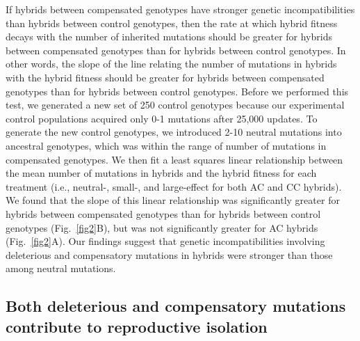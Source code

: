 \documentclass{article}
\begin{document}
If hybrids between compensated genotypes
have stronger genetic incompatibilities
than hybrids between control genotypes,
then the rate at which hybrid fitness decays
with the number of inherited mutations should be greater
for hybrids between compensated genotypes
than for hybrids between control genotypes.
%
In other words, the slope of the line relating
the number of mutations in hybrids
with the hybrid fitness should be greater
for hybrids between compensated genotypes
than for hybrids between control genotypes.
%
Before we performed this test,
we generated a new set of 250 control genotypes
because our experimental control populations
acquired only 0-1 mutations after 25,000 updates.
%
To generate the new control genotypes,
we introduced 2-10 neutral mutations into ancestral genotypes,
which was within the range of number of mutations in compensated genotypes.
%
We then fit a least squares linear relationship between
the mean number of mutations in hybrids
and the hybrid fitness for each treatment
(i.e., neutral-, small-, and large-effect for both AC and CC hybrids).
%
We found that the slope of this linear relationship
was significantly greater for hybrids between compensated genotypes
than for hybrids between control genotypes (Fig.~\ref{fig2}B),
but was not significantly greater for AC hybrids (Fig.~\ref{fig2}A).
%
Our findings suggest that genetic incompatibilities
involving deleterious and compensatory mutations in hybrids
were stronger than those among neutral mutations.



\subsection*{Both deleterious and compensatory mutations
  contribute to reproductive isolation}
\end{document}
